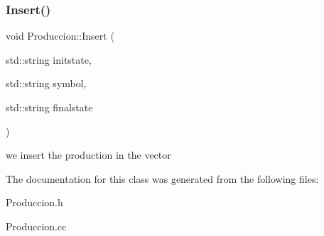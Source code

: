 \subsubsection{\texorpdfstring{Insert()}{Insert()}}
{\footnotesize\ttfamily void Produccion\+::\+Insert (\begin{DoxyParamCaption}\item[{std\+::string}]{initstate,  }\item[{std\+::string}]{symbol,  }\item[{std\+::string}]{finalstate }\end{DoxyParamCaption})}

we insert the production in the vector 

The documentation for this class was generated from the following files\+:\begin{DoxyCompactItemize}
\item 
Produccion.\+h\item 
Produccion.\+cc\end{DoxyCompactItemize}
